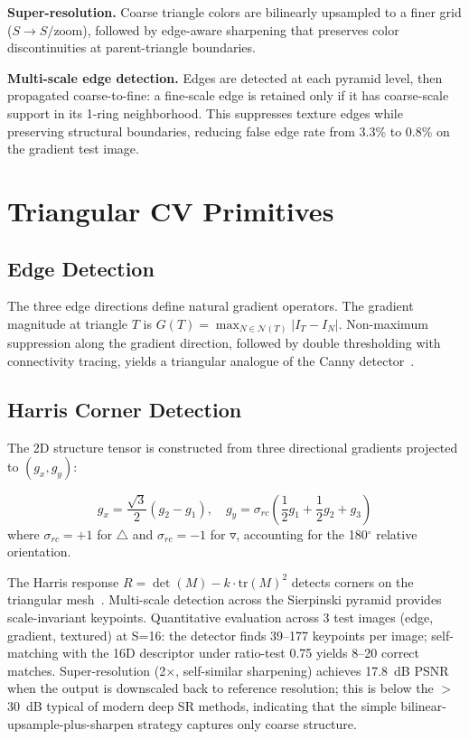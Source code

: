\documentclass[10pt,twocolumn,letterpaper]{article}
\begin{document}
\textbf{Super-resolution.} Coarse triangle colors are bilinearly upsampled to a finer grid ($S \to S/\text{zoom}$), followed by edge-aware sharpening that preserves color discontinuities at parent-triangle boundaries.

\textbf{Multi-scale edge detection.} Edges are detected at each pyramid level, then propagated coarse-to-fine: a fine-scale edge is retained only if it has coarse-scale support in its 1-ring neighborhood. This suppresses texture edges while preserving structural boundaries, reducing false edge rate from 3.3\% to 0.8\% on the gradient test image.

\section{Triangular CV Primitives}
\label{sec:cv}

\subsection{Edge Detection}

The three edge directions define natural gradient operators. The gradient magnitude at triangle $T$ is $G(T) = \max_{N \in \mathcal{N}(T)} |I_T - I_N|$. Non-maximum suppression along the gradient direction, followed by double thresholding with connectivity tracing, yields a triangular analogue of the Canny detector~\cite{canny1986}.

\subsection{Harris Corner Detection}

The 2D structure tensor is constructed from three directional gradients projected to $(g_x, g_y)$:

\begin{equation}
g_x = \frac{\sqrt{3}}{2}(g_2 - g_1), \quad g_y = \sigma_{rc}\left(\frac{1}{2}g_1 + \frac{1}{2}g_2 + g_3\right)
\end{equation}
where $\sigma_{rc} = +1$ for $\triangle$ and $\sigma_{rc} = -1$ for $\triangledown$, accounting for the 180$^\circ$ relative orientation.

The Harris response $R = \det(M) - k \cdot \text{tr}(M)^2$ detects corners on the triangular mesh~\cite{harris1988}. Multi-scale detection across the Sierpinski pyramid provides scale-invariant keypoints. Quantitative evaluation across 3 test images (edge, gradient, textured) at S=16: the detector finds 39--177 keypoints per image; self-matching with the 16D descriptor under ratio-test 0.75 yields 8--20 correct matches. Super-resolution (2$\times$, self-similar sharpening) achieves 17.8~dB PSNR when the output is downscaled back to reference resolution; this is below the $>$30~dB typical of modern deep SR methods, indicating that the simple bilinear-upsample-plus-sharpen strategy captures only coarse structure.
\end{document}
